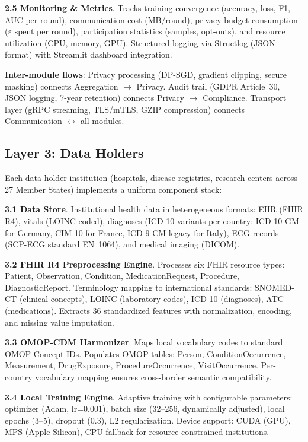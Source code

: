 \documentclass[conference]{IEEEtran}
\begin{document}
\textbf{2.5 Monitoring \& Metrics}. Tracks training convergence (accuracy, loss, F1, AUC per round), communication cost (MB/round), privacy budget consumption ($\varepsilon$ spent per round), participation statistics (samples, opt-outs), and resource utilization (CPU, memory, GPU). Structured logging via Structlog (JSON format) with Streamlit dashboard integration.

\textbf{Inter-module flows}: Privacy processing (DP-SGD, gradient clipping, secure masking) connects Aggregation $\to$ Privacy. Audit trail (GDPR Article~30, JSON logging, 7-year retention) connects Privacy $\to$ Compliance. Transport layer (gRPC streaming, TLS/mTLS, GZIP compression) connects Communication $\leftrightarrow$ all modules.

\subsection{Layer 3: Data Holders}

Each data holder institution (hospitals, disease registries, research centers across 27 Member States) implements a uniform component stack:

\textbf{3.1 Data Store}. Institutional health data in heterogeneous formats: EHR (FHIR R4), vitals (LOINC-coded), diagnoses (ICD-10 variants per country: ICD-10-GM for Germany, CIM-10 for France, ICD-9-CM legacy for Italy), ECG records (SCP-ECG standard EN~1064), and medical imaging (DICOM).

\textbf{3.2 FHIR R4 Preprocessing Engine}. Processes six FHIR resource types: Patient, Observation, Condition, MedicationRequest, Procedure, DiagnosticReport. Terminology mapping to international standards: SNOMED-CT (clinical concepts), LOINC (laboratory codes), ICD-10 (diagnoses), ATC (medications). Extracts 36 standardized features with normalization, encoding, and missing value imputation.

\textbf{3.3 OMOP-CDM Harmonizer}. Maps local vocabulary codes to standard OMOP Concept IDs. Populates OMOP tables: Person, ConditionOccurrence, Measurement, DrugExposure, ProcedureOccurrence, VisitOccurrence. Per-country vocabulary mapping ensures cross-border semantic compatibility.

\textbf{3.4 Local Training Engine}. Adaptive training with configurable parameters: optimizer (Adam, lr=0.001), batch size (32--256, dynamically adjusted), local epochs (3--5), dropout (0.3), L2 regularization. Device support: CUDA (GPU), MPS (Apple Silicon), CPU fallback for resource-constrained institutions.
\end{document}
